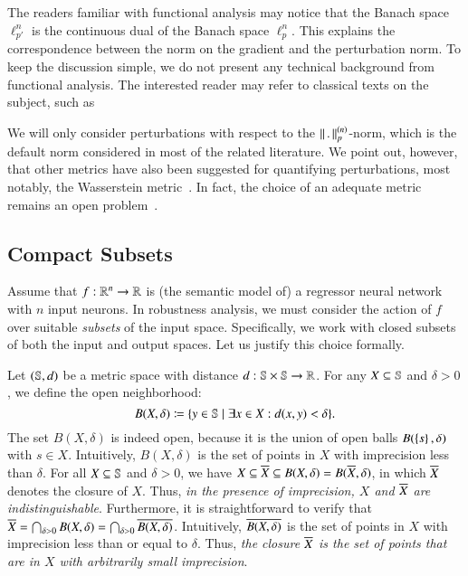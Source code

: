 \documentclass[11pt,times]{article}
\begin{document}
\begin{remark}
  \label{rem:func_analysis_dual_Banach}
  The readers familiar with functional analysis may notice that the
  Banach space $\ell^n_{p'}$ is the continuous dual of the Banach
  space $\ell^n_p$. This explains the correspondence between the norm
  on the gradient and the perturbation norm. To keep the discussion
  simple, we do not present any technical background from functional
  analysis. The interested reader may refer to classical texts on the
  subject, such
  as~\parencite{Rudin:Functional_Analysis:Book:1991,Albiac_Kalton:Banach_Theory:Book:2006}
\end{remark}


\begin{remark}
\label{rem:Wasserstein_metric}
  We will only consider perturbations with respect to the
  ${\left\lVert\thinspace {.} \thinspace \right\rVert}^{(n)}_p$-norm, which is the default norm considered in
  most of the related literature. We point out, however, that other
  metrics have also been suggested for quantifying perturbations, most
  notably, the Wasserstein
  metric~\parencite{Wong_Schmidt_Kolter:Wasserstein_Adversarial:2019}. In
  fact, the choice of an adequate metric remains an open
  problem~\parencite{Serban_at_al:adversarial:2020}.
\end{remark}






\subsection{Compact Subsets}

Assume that $f: \mathbb{R}^n \to \mathbb{R}$ is (the semantic model of) a regressor
neural network with $n$ input neurons. In robustness analysis, we must
consider the action of $f$ over suitable \emph{subsets} of the input
space. Specifically, we work with closed subsets of both the input and
output spaces. Let us justify this choice formally.

 
Let $(\mathbb{S},d)$ be a metric space with
distance $d: \mathbb{S} \times \mathbb{S} \to \mathbb{R}$. For any
$X \subseteq \mathbb{S}$ and $\delta>0$, we define the open neighborhood:
%
\begin{equation}
  \label{eq:B_X_delta}
  B(X,\delta)\coloneqq\{y \in \mathbb{S} \mid \exists x \in X :
  d(x,y)<\delta\}.
\end{equation}
%
The set $B(X,\delta)$ is indeed open, because it is the union of open
balls $B(\left\{{s}\right\},\delta)$ with $s \in X$. Intuitively, $B(X,\delta)$
is the set of points in $X$ with imprecision less than $\delta$. For
all $X \subseteq \mathbb{S}$ and $\delta>0$, we have
$X\subseteq\overline{X}\subseteq B(X,\delta)=B(\overline{X},\delta)$, in which
$\overline{X}$ denotes the closure of $X$. Thus, \emph{in the presence of
  imprecision, $X$ and $\overline{X}$ are indistinguishable}. Furthermore,
it is straightforward to verify that
$\overline{X}=\bigcap_{\delta>0}B(X,\delta)=\bigcap_{\delta>0}\overline{B(X,\delta)}$. Intuitively,
$\overline{B(X,\delta)}$ is the set of points in $X$ with imprecision less
than or equal to $\delta$. Thus, \emph{the closure $\overline{X}$ is the set
  of points that are in $X$ with arbitrarily small imprecision}.
\end{document}

